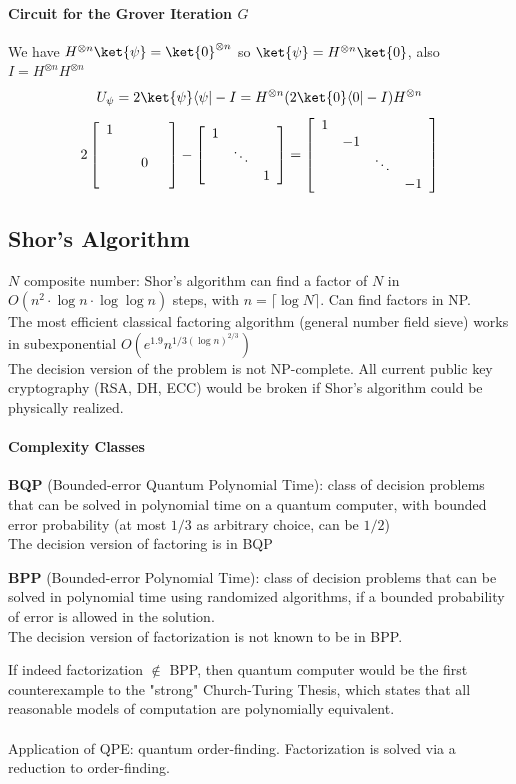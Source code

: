 \documentclass[10pt]{report}
\begin{document}
\paragraph{Circuit for the Grover Iteration $G$}
We have $H^{\otimes n}\ket{\psi} = \ket{0}^{\otimes n}$ so $\ket{\psi} = H^{\otimes n}\ket{0}$, also $I = H^{\otimes n}H^{\otimes n}$
$$U_\psi=2\ket{\psi}\langle\psi|-I = H^{\otimes n}(2\ket{0}\langle0|-I)H^{\otimes n}$$
$$2\left[\begin{array}{c c c c c}
1\\\\&&0\\&&&\\
\end{array}\right]-\left[\begin{array}{c c c}
1\\&\ddots\\&&1
\end{array}\right] = \left[\begin{array}{c c c c}
1\\&-1\\&&\ddots\\&&&-1
\end{array}\right]$$
\subsection{Shor's Algorithm} $N$ composite number: Shor's algorithm can find a factor of $N$ in $O(n^2\cdot\log n\cdot\log\log n)$ steps, with $n=\lceil\log N\rceil$. Can find factors in NP.\\
The most efficient classical factoring algorithm (general number field sieve) works in subexponential $O(e^{1.9}n^{1/3(\log n)^{2/3}})$\\
The decision version of the problem is not NP-complete. All current public key cryptography (RSA, DH, ECC) would be broken if Shor's algorithm could be physically realized.
\paragraph{Complexity Classes}
\begin{list}{}{}
	\item \textbf{BQP} (Bounded-error Quantum Polynomial Time): class of decision problems that can be solved in polynomial time on a quantum computer, with bounded error probability (at most $1/3$ as arbitrary choice, can be $1/2$)\\
	The decision version of factoring is in BQP
	\item \textbf{BPP} (Bounded-error Polynomial Time): class of decision problems that can be solved in polynomial time using randomized algorithms, if a bounded probability of error is allowed in the solution.\\
	The decision version of factorization is not known to be in BPP.
\end{list}
If indeed factorization $\not\in$ BPP, then quantum computer would be the first counterexample to the "strong" Church-Turing Thesis, which states that all reasonable models of computation are polynomially equivalent.\\\\
Application of QPE: quantum order-finding. Factorization is solved via a reduction to order-finding.
\end{document}

